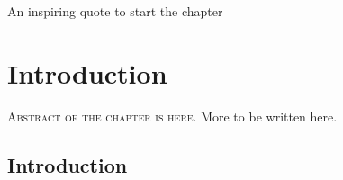 
\begin{savequote}[65mm]
An inspiring quote to start the chapter
\end{savequote}

\chapter{Introduction}
\label{chap:intro}

\lettrine[lines=3]{\textcolor{SchoolColor}{A}}{bstract of the chapter is here}.
More to be written here.
\lipsum[1]

\section{Introduction}

\lipsum[3-5]
